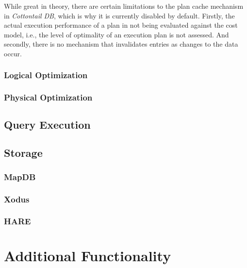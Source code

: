 While great in theory, there are certain limitations to the plan cache mechanism in \emph{Cottontail DB}, which is why it is currently disabled by default. Firstly, the actual execution performance of a plan in not being evaluated against the cost model, i.e., the level of optimality of an execution plan is not assessed. And secondly, there is no mechanism that invalidates entries as changes to the data occur. 

\subsubsection{Logical Optimization}
\subsubsection{Physical Optimization}


\subsection{Query Execution}


\subsection{Storage}
\subsubsection{MapDB}
\subsubsection{Xodus}
\subsubsection{HARE}



\section{Additional Functionality}

